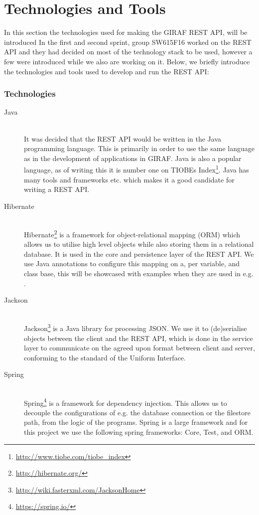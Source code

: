 \section{Technologies and Tools}\label{sec:techstack}
In this section the technologies used for making the GIRAF REST API, will be introduced
In the first and second sprint, group SW615F16 worked on the REST API and they had decided on most of the technology stack to be used, however a few were introduced while we also are working on it.
Below, we briefly introduce the technologies and tools used to develop and run the REST API:
\subsubsection{Technologies}
\begin{description}
    \item[Java] \hfill \\
        It was decided that the REST API would be written in the Java programming language.
        This is primarily in order to use the same language as in the development of applications in GIRAF.
        Java is also a popular language, as of writing this it is number one on TIOBEs Index\footnote{\url{http://www.tiobe.com/tiobe_index}}.
        Java has many tools and frameworks etc. which makes it a good candidate for writing a REST API.

    \item[Hibernate] \hfill \\
        Hibernate\footnote{\url{http://hibernate.org/}} is a framework for object-relational mapping (ORM) which allows us to utilise high level objects while also storing them in a relational database.
        It is used in the core and persistence layer of the REST API.
        We use Java annotations to configure this mapping on a, per variable, and class base, this will be showcased with examples when they are used in e.g. .

    \item[Jackson] \hfill \\
        Jackson\footnote{\url{http://wiki.fasterxml.com/JacksonHome}} is a Java library for processing JSON.
        We use it to (de)serialise objects between the client and the REST API, which is done in the service layer to communicate on the agreed upon format between client and server, conforming to the standard of the Uniform Interface.

    \item[Spring] \hfill \\
        Spring\footnote{\url{https://spring.io/}} is a framework for dependency injection.
        This allows us to decouple the configurations of e.g. the database connection or the filestore path, from the logic of the programs.
        Spring is a large framework and for this project we use the following spring frameworks: Core, Test, and ORM.


\end{description}
